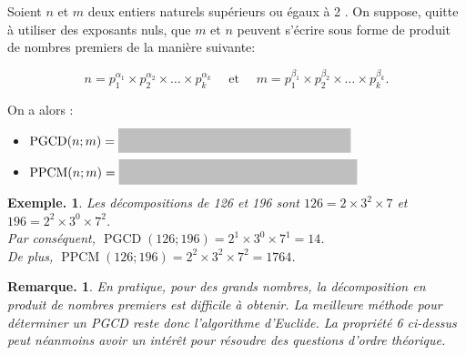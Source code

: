 \documentclass[12pt]{article}
\newcommand{\hideM}[1]{\mbox{\vphantom{$#1$}\smash{\colorbox{gray!50}{\phantom{$\displaystyle #1$}}}} }
\theoremstyle{break}
\newtheorem*{example}{Exemple.}
\newtheorem*{remark}{Remarque.}
\begin{document}
\begin{proposition}{}{}
Soient $n$ et $m$ deux entiers naturels supérieurs ou égaux à 2 . On suppose, quitte à utiliser des exposants nuls, que $m$ et $n$ peuvent s'écrire sous forme de produit de nombres premiers de la manière suivante:

$$
n=p_{1}^{\alpha_{1}} \times p_{2}^{\alpha_{2}} \times \ldots \times p_{k}^{\alpha_{k}} \quad \text { et } \quad m=p_{1}^{\beta_{1}} \times p_{2}^{\beta_{2}} \times \ldots \times p_{k}^{\beta_{k}} .
$$

On a alors :

\begin{itemize}[noitemsep,topsep=0pt]
  \item $\operatorname{PGCD}(n ; m)=\hideM{p_{1}^{\min \left(\alpha_{1} \beta_{1}\right)} \times p_{2}^{\min \left(\alpha_{2} \beta_{2}\right)} \times \ldots \times p_{k}^{\min \left(\alpha_{k} \beta_{k}\right)}}$
  \item $\operatorname{PPCM}(n ; m)=\hideM{p_{1}^{\max \left(\alpha_{1} \beta_{1}\right)} \times p_{2}^{\max \left(\alpha_{2} \beta_{2}\right)} \times \ldots \times p_{k}^{\max \left(\alpha_{k} \beta_{k}\right)}}$
\end{itemize}
\end{proposition}

\begin{example}
Les décompositions de 126 et 196 sont $126=2 \times 3^{2} \times 7$ et $196=2^{2} \times 3^{0} \times 7^{2}$.\\
Par conséquent, $\operatorname{PGCD}(126 ; 196)=2^{1} \times 3^{0} \times 7^{1}=14$.\\
De plus, $\operatorname{PPCM}(126 ; 196)=2^{2} \times 3^{2} \times 7^{2}=1764$.
\end{example}

\begin{remark}
En pratique, pour des grands nombres, la décomposition en produit de nombres premiers est difficile à obtenir. La meilleure méthode pour déterminer un PGCD reste donc l'algorithme d'Euclide. La propriété 6 ci-dessus peut néanmoins avoir un intérêt pour résoudre des questions d'ordre théorique.
\end{remark}
\end{document}
